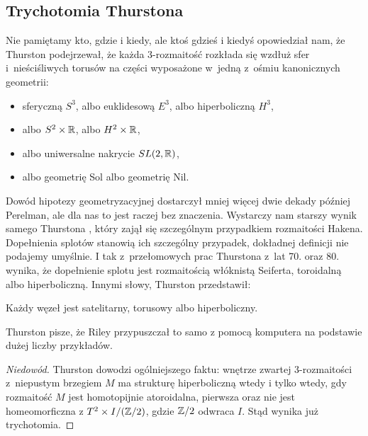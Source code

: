 \subsection{Trychotomia Thurstona}
Nie pamiętamy kto, gdzie i kiedy, ale ktoś gdzieś i kiedyś opowiedział nam, że Thurston podejrzewał, że każda 3-rozmaitość rozkłada się wzdłuż sfer i~nieściśliwych torusów na części wyposażone w~jedną z~ośmiu kanonicznych geometrii:
\begin{itemize}
\item sferyczną $S^3$, albo euklidesową $E^3$, albo hiperboliczną $H^3$,
\item albo $S^2 \times \mathbb R$, albo $H^2 \times \mathbb R$,
\item albo uniwersalne nakrycie $SL(2, \mathbb R)$,
\item albo geometrię Sol albo geometrię Nil.
\end{itemize}
%
Dowód hipotezy geometryzacyjnej dostarczył mniej więcej dwie dekady później Perelman, ale dla nas to jest raczej bez znaczenia.
%
Wystarczy nam starszy wynik samego Thurstona \cite{thurston1982}, który zajął się szczególnym przypadkiem rozmaitości Hakena.
%
Dopełnienia splotów stanowią ich szczególny przypadek, dokładnej definicji nie podajemy umyślnie.
I tak z~przełomowych prac Thurstona z~lat 70. oraz 80. wynika, że dopełnienie splotu jest rozmaitością włóknistą Seiferta, toroidalną albo hiperboliczną.
%
%
%
Innymi słowy, Thurston przedstawił:

\begin{theorem}
%
%
%
    Każdy węzeł jest satelitarny, torusowy albo hiperboliczny.
\end{theorem}

Thurston pisze, że Riley przypuszczał to samo z pomocą komputera na podstawie dużej liczby przykładów.
%
%

\begin{proof}[Niedowód]
    Thurston \cite[s. 360]{thurston1982} dowodzi ogólniejszego faktu: wnętrze zwartej 3-rozmaitości z~niepustym brzegiem $M$ ma strukturę hiperboliczną wtedy i tylko wtedy, gdy rozmaitość $M$ jest homotopijnie atoroidalna, pierwsza oraz nie jest homeomorficzna z $T^2 \times I / (\mathbb Z/2)$, gdzie $\mathbb Z/2$ odwraca $I$.
    Stąd wynika już trychotomia.
\end{proof}

